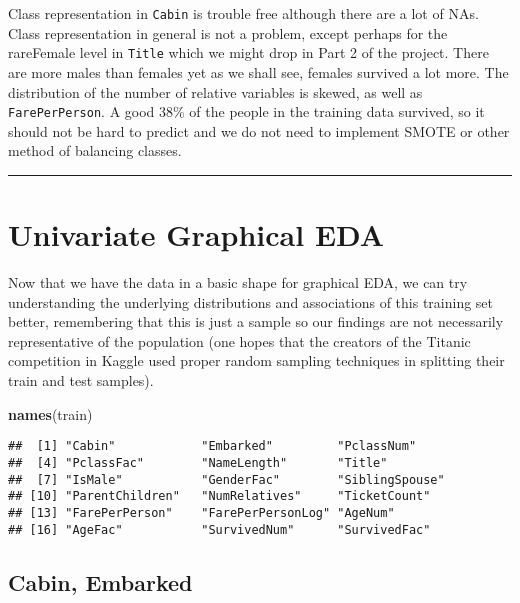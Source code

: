 \documentclass[]{article}
\newenvironment{Shaded}{\begin{snugshade}}{\end{snugshade}}
\newcommand{\KeywordTok}[1]{\textcolor[rgb]{0.13,0.29,0.53}{\textbf{#1}}}
\newcommand{\NormalTok}[1]{#1}
\begin{document}
Class representation in \texttt{Cabin} is trouble free although there
are a lot of NAs. Class representation in general is not a problem,
except perhaps for the rareFemale level in \texttt{Title} which we might
drop in Part 2 of the project. There are more males than females yet as
we shall see, females survived a lot more. The distribution of the
number of relative variables is skewed, as well as
\texttt{FarePerPerson}. A good 38\% of the people in the training data
survived, so it should not be hard to predict and we do not need to
implement SMOTE or other method of balancing classes.

\begin{center}\rule{0.5\linewidth}{\linethickness}\end{center}

\hypertarget{unigraphEDA-link}{\section{Univariate Graphical
EDA}\label{unigraphEDA-link}}

Now that we have the data in a basic shape for graphical EDA, we can try
understanding the underlying distributions and associations of this
training set better, remembering that this is just a sample so our
findings are not necessarily representative of the population (one hopes
that the creators of the Titanic competition in Kaggle used proper
random sampling techniques in splitting their train and test samples).

\begin{Shaded}
\begin{Highlighting}[]
\KeywordTok{names}\NormalTok{(train)}
\end{Highlighting}
\end{Shaded}

\begin{verbatim}
##  [1] "Cabin"            "Embarked"         "PclassNum"       
##  [4] "PclassFac"        "NameLength"       "Title"           
##  [7] "IsMale"           "GenderFac"        "SiblingSpouse"   
## [10] "ParentChildren"   "NumRelatives"     "TicketCount"     
## [13] "FarePerPerson"    "FarePerPersonLog" "AgeNum"          
## [16] "AgeFac"           "SurvivedNum"      "SurvivedFac"
\end{verbatim}

\subsection{Cabin, Embarked}\label{cabin-embarked}
\end{document}
